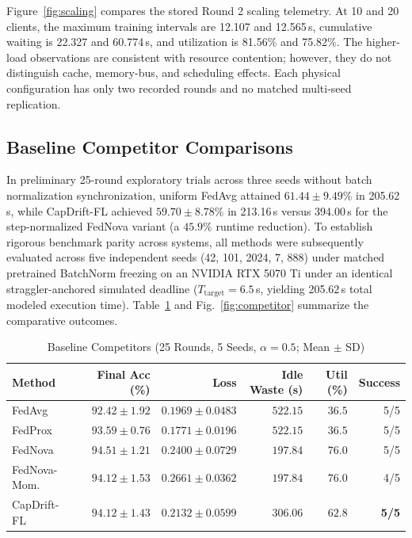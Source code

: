 \documentclass[conference]{IEEEtran}
\begin{document}
Figure~\ref{fig:scaling} compares the stored Round 2 scaling telemetry. At 10 and 20 clients, the maximum training intervals are 12.107 and 12.565\,s, cumulative waiting is 22.327 and 60.774\,s, and utilization is 81.56\% and 75.82\%. The higher-load observations are consistent with resource contention; however, they do not distinguish cache, memory-bus, and scheduling effects. Each physical configuration has only two recorded rounds and no matched multi-seed replication.

\subsection{Baseline Competitor Comparisons}\label{subsec:competitors}
In preliminary 25-round exploratory trials across three seeds without batch normalization synchronization, uniform FedAvg attained $61.44\pm9.49\%$ in 205.62\,s, while CapDrift-FL achieved $59.70\pm8.78\%$ in 213.16\,s versus 394.00\,s for the step-normalized FedNova variant (a $45.9\%$ runtime reduction).
To establish rigorous benchmark parity across systems, all methods were subsequently evaluated across five independent seeds (42, 101, 2024, 7, 888) under matched pretrained BatchNorm freezing on an NVIDIA RTX 5070 Ti under an identical straggler-anchored simulated deadline ($T_{\mathrm{target}} = 6.5$\,s, yielding 205.62\,s total modeled execution time). Table~\ref{tab:competitors} and Fig.~\ref{fig:competitor} summarize the comparative outcomes.

\begin{table}[t]
\caption{Baseline Competitors (25 Rounds, 5 Seeds, $\alpha=0.5$; Mean $\pm$ SD)}
\label{tab:competitors}
\centering\scriptsize
\begin{tabular}{@{}lrrrrr@{}}
\toprule
Method & Final Acc (\%) & Loss & Idle Waste (s) & Util (\%) & Success\\
\midrule
FedAvg & $92.42\pm1.92$ & $0.1969\pm0.0483$ & $522.15$ & $36.5$ & 5/5\\
FedProx & $93.59\pm0.76$ & $0.1771\pm0.0196$ & $522.15$ & $36.5$ & 5/5\\
FedNova & $94.51\pm1.21$ & $0.2400\pm0.0729$ & $197.84$ & $76.0$ & 5/5\\
FedNova-Mom. & $94.12\pm1.53$ & $0.2661\pm0.0362$ & $197.84$ & $76.0$ & 4/5\\
CapDrift-FL & $\mathbf{94.12\pm1.43}$ & $\mathbf{0.2132\pm0.0599}$ & $\mathbf{306.06}$ & $\mathbf{62.8}$ & \textbf{5/5}\\
\bottomrule
\end{tabular}
\end{table}
\end{document}
